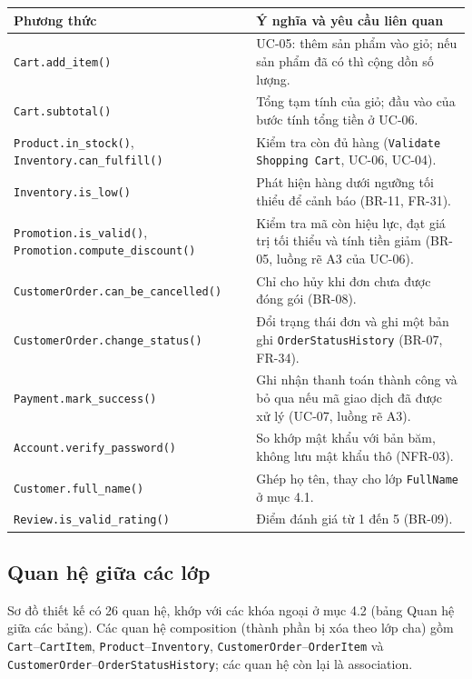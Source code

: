 \documentclass[12pt,a4paper,oneside]{report}
\begin{document}
\begin{longtable}{p{4.6cm}p{11.2cm}}
\toprule
\textbf{Phương thức} & \textbf{Ý nghĩa và yêu cầu liên quan} \\
\midrule
\endhead
\bottomrule
\endlastfoot
\texttt{Cart.add\_item()} & UC-05: thêm sản phẩm vào giỏ; nếu sản phẩm đã có thì cộng dồn số lượng. \\
\texttt{Cart.subtotal()} & Tổng tạm tính của giỏ; đầu vào của bước tính tổng tiền ở UC-06. \\
\texttt{Product.in\_stock()}, \texttt{Inventory.can\_fulfill()} & Kiểm tra còn đủ hàng (\texttt{Validate Shopping Cart}, UC-06, UC-04). \\
\texttt{Inventory.is\_low()} & Phát hiện hàng dưới ngưỡng tối thiểu để cảnh báo (BR-11, FR-31). \\
\texttt{Promotion.is\_valid()}, \texttt{Promotion.compute\_discount()} & Kiểm tra mã còn hiệu lực, đạt giá trị tối thiểu và tính tiền giảm (BR-05, luồng rẽ A3 của UC-06). \\
\texttt{CustomerOrder.can\_be\_cancelled()} & Chỉ cho hủy khi đơn chưa được đóng gói (BR-08). \\
\texttt{CustomerOrder.change\_status()} & Đổi trạng thái đơn và ghi một bản ghi \texttt{OrderStatusHistory} (BR-07, FR-34). \\
\texttt{Payment.mark\_success()} & Ghi nhận thanh toán thành công và bỏ qua nếu mã giao dịch đã được xử lý (UC-07, luồng rẽ A3). \\
\texttt{Account.verify\_password()} & So khớp mật khẩu với bản băm, không lưu mật khẩu thô (NFR-03). \\
\texttt{Customer.full\_name()} & Ghép họ tên, thay cho lớp \texttt{FullName} ở mục 4.1. \\
\texttt{Review.is\_valid\_rating()} & Điểm đánh giá từ 1 đến 5 (BR-09). \\
\end{longtable}

\subsection{Quan hệ giữa các lớp}

Sơ đồ thiết kế có 26 quan hệ, khớp với các khóa ngoại ở mục 4.2 (bảng Quan hệ giữa các bảng). Các quan hệ composition (thành phần bị xóa theo lớp cha) gồm \texttt{Cart}--\texttt{CartItem}, \texttt{Product}--\texttt{Inventory}, \texttt{CustomerOrder}--\texttt{OrderItem} và \texttt{CustomerOrder}--\texttt{OrderStatusHistory}; các quan hệ còn lại là association.
\end{document}
